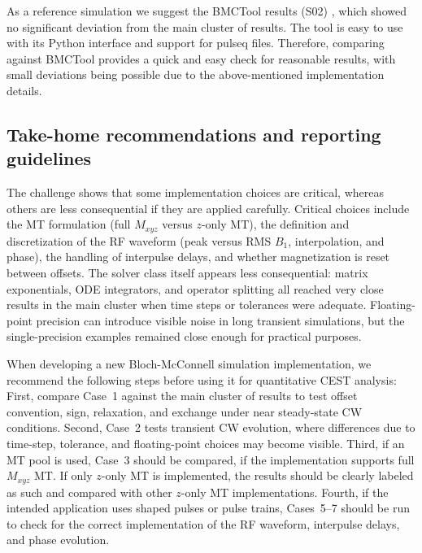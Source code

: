\documentclass[11pt,a4paper]{article}
\begin{document}
As a reference simulation we suggest the BMCTool results (S02) \cite{SchuenkeBMC}, which showed no significant deviation from the main cluster of results. The tool is easy to use with its Python interface and support for pulseq files. Therefore, comparing against BMCTool provides a quick and easy check for reasonable results, with small deviations being possible due to the above-mentioned implementation details. 

\subsection{Take-home recommendations and reporting guidelines}\label{subsec:recs}
The challenge shows that some implementation choices are critical, whereas others are less consequential if they are applied carefully.
Critical choices include the MT formulation (full $M_{xyz}$ versus $z$-only MT), the definition and discretization of the RF waveform (peak versus RMS $B_1$, interpolation, and phase), the handling of interpulse delays, and whether magnetization is reset between offsets.
The solver class itself appears less consequential: matrix exponentials, ODE integrators, and operator splitting all reached very close results in the main cluster when time steps or tolerances were adequate.
Floating-point precision can introduce visible noise in long transient simulations, but the single-precision examples remained close enough for practical purposes.

When developing a new Bloch-McConnell simulation implementation, we recommend the following steps before using it for quantitative CEST analysis:
First, compare Case~1 against the main cluster of results to test offset convention, sign, relaxation, and exchange under near steady-state CW conditions.
Second, Case~2 tests transient CW evolution, where differences due to time-step, tolerance, and floating-point choices may become visible.
Third, if an MT pool is used, Case~3 should be compared, if the implementation supports full $M_{xyz}$ MT. If only $z$-only MT is implemented, the results should be clearly labeled as such and compared with other $z$-only MT implementations.
Fourth, if the intended application uses shaped pulses or pulse trains, Cases~5--7 should be run to check for the correct implementation of the RF waveform, interpulse delays, and phase evolution.
\end{document}
